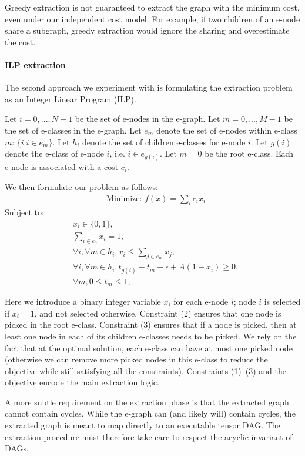 \documentclass{article}
\begin{document}
Greedy extraction is not guaranteed to extract the graph with the minimum cost, even under our independent cost model.
For example, if two children of an e-node share a subgraph, greedy extraction would ignore the sharing and overestimate the cost. 

\paragraph{ILP extraction}
The second approach we experiment with is formulating the extraction problem as an Integer Linear Program (ILP).

Let $i = 0, ..., N-1$ be the set of e-nodes in the e-graph. 
Let $m = 0, ..., M-1$ be the set of e-classes in the e-graph.
Let $e_m$ denote the set of e-nodes within e-class $m$: $\{i | i\in e_m \}$. 
Let $h_i$ denote the set of children e-classes for e-node $i$.
Let $g(i)$ denote the e-class of e-node $i$, i.e. $i\in e_{g(i)}$.
Let $m=0$ be the root e-class. 
Each e-node is associated with a cost $c_i$. 

We then formulate our problem as follows:
\begin{align*}
    &\textrm{Minimize: } f(x) = \sum_{i} c_i x_i 
\end{align*}
Subject to:
\begin{align}
    &x_i \in \{0, 1\}, \\
    &\sum_{i\in e_0} x_i = 1, \\
    &\forall i, \forall m \in h_i, x_i \leq \sum_{j\in e_m} x_j , \\
    & \forall i, \forall m \in h_i, t_{g(i)} - t_m - \epsilon + A (1 - x_i) \geq 0, \\
    &\forall m, 0 \leq t_m \leq 1, 
\end{align}

Here we introduce a binary integer variable $x_i$ for each e-node $i$; node $i$ is selected if $x_i=1$, and not selected otherwise.
Constraint (2) ensures that one node is picked in the root e-class.
Constraint (3) ensures that if a node is picked, then at least one node in each of its children e-classes needs to be picked. 
We rely on the fact that at the optimal solution, each e-class can have at most one picked node (otherwise we can remove more picked nodes in this e-class to reduce the objective while still satisfying all the constraints). 
Constraints (1)--(3) and the objective encode the main extraction logic. 

A more subtle requirement on the extraction phase is that the extracted graph cannot contain cycles.
While the e-graph can (and likely will) contain cycles, the extracted graph is meant to map directly to an executable tensor DAG.
The extraction procedure must therefore take care to respect the acyclic invariant of DAGs.
\end{document}
